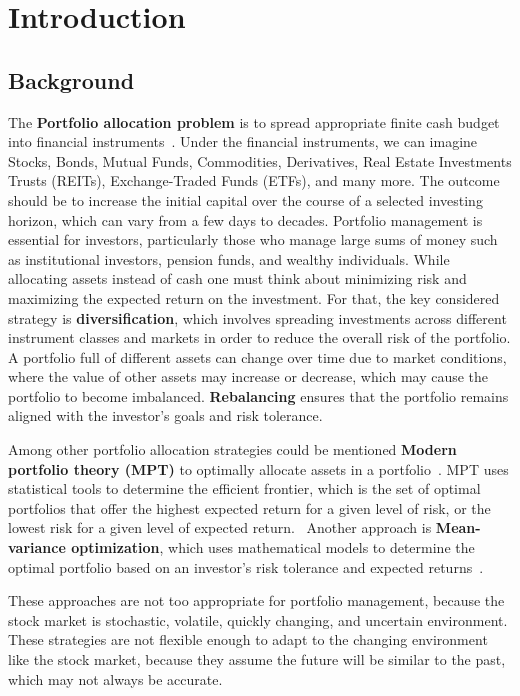 \documentclass[../xlapes02]{subfiles}
\begin{document}
\chapter{Introduction}\label{ch:introduction}


\section{Background}\label{sec:background}
The \textbf{Portfolio allocation problem} is to spread appropriate finite cash budget into financial instruments~\cite{Model-Free-Reinforcement-Learning-for-Asset-Allocation}.
Under the financial instruments, we can imagine Stocks, Bonds, Mutual Funds, Commodities, Derivatives, Real Estate Investments Trusts (REITs), Exchange-Traded Funds (ETFs), and many more.
The outcome should be to increase the initial capital over the course of a selected investing horizon, which can vary from a few days to decades.
Portfolio management is essential for investors, particularly those who manage large sums of money such as institutional investors, pension funds, and wealthy individuals.
While allocating assets instead of cash one must think about minimizing risk and maximizing the expected return on the investment.
For that, the key considered strategy is \textbf{diversification}, which involves spreading investments across different instrument classes and markets in order to reduce the overall risk of the portfolio.
A portfolio full of different assets can change over time due to market conditions, where the value of other assets may increase or decrease, which may cause the portfolio to become imbalanced.
\textbf{Rebalancing} ensures that the portfolio remains aligned with the investor's goals and risk tolerance.

Among other portfolio allocation strategies could be mentioned \textbf{Modern portfolio theory (MPT)} to optimally allocate assets in a portfolio~\cite{modern-portfolio-theory}.
MPT uses statistical tools to determine the efficient frontier, which is the set of optimal portfolios that offer the highest expected return for a given level of risk, or the lowest risk for a given level of expected return.~\cite{sirucek-2015}
Another approach is \textbf{Mean-variance optimization}, which uses mathematical models to determine the optimal portfolio based on an investor's risk tolerance and expected returns~\cite{meanvarianceportfoliooptimazation}.

These approaches are not too appropriate for portfolio management, because the stock market is stochastic, volatile, quickly changing, and uncertain environment.
These strategies are not flexible enough to adapt to the changing environment like the stock market, because they assume the future will be similar to the past, which may not always be accurate.
\end{document}
